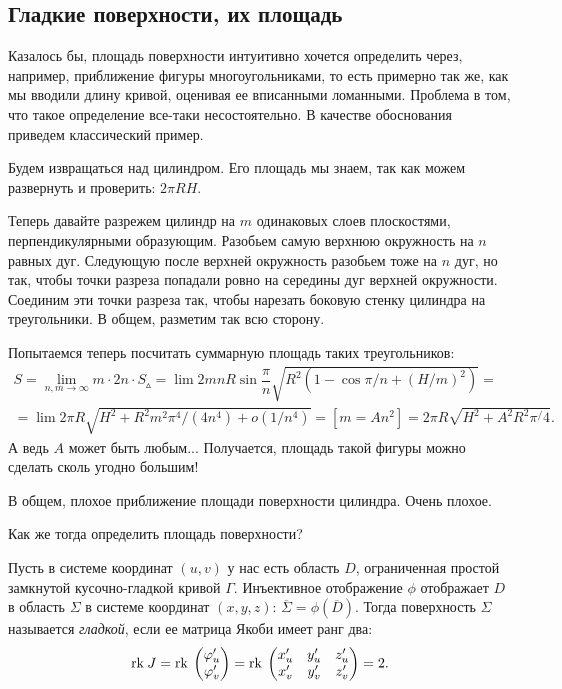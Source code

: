 \subsection{Гладкие поверхности, их площадь}
Казалось бы, площадь поверхности интуитивно хочется определить через, например, приближение фигуры многоугольниками, то есть примерно так же, как мы вводили длину кривой, оценивая ее вписанными ломанными. Проблема в том, что такое определение все-таки несостоятельно. В качестве обоснования приведем классический пример.

\begin{Examples}
Будем извращаться над цилиндром. Его площадь мы знаем, так как можем развернуть и проверить: $2\pi R H$.

Теперь давайте разрежем цилиндр на $m$ одинаковых слоев плоскостями, перпендикулярными образующим. Разобьем самую верхнюю окружность на $n$ равных дуг. Следующую после верхней окружность разобьем тоже на $n$ дуг, но так, чтобы точки
разреза попадали ровно на середины дуг верхней окружности. Соединим эти точки разреза так, чтобы нарезать боковую стенку цилиндра на треугольники. В общем, разметим так всю сторону.

Попытаемся теперь посчитать суммарную площадь таких треугольников:
\begin{gather*}
S = \lim\limits_{n, m \to \infty} m \cdot 2n \cdot S_\vartriangle = \lim 2mn R \sin \dfrac{\pi}{n}\sqrt{R^2(1 - \cos \pi/n + (H/m)^2)} =\\= \lim 2\pi R \sqrt{H^2 + R^2m^2 \pi^4/(4n^4) + o(1/n^4)} = [m = An^2] = 2\pi R\sqrt{H^2 + A^2R^2\pi^/4}.
\end{gather*}
А ведь $A$ может быть любым... Получается, площадь такой фигуры можно сделать сколь угодно большим!

В общем, плохое приближение площади поверхности цилиндра. Очень плохое.
\end{Examples}

Как же тогда определить площадь поверхности?

\begin{Def}
Пусть в системе координат $(u, v)$ у нас есть область $D$, ограниченная простой замкнутой кусочно-гладкой кривой $\Gamma$. Инъективное отображение $\phi$ отображает $D$ в область $\Sigma$ в системе координат $(x, y, z)$: $\overline\Sigma = \phi(\overline D)$. Тогда поверхность $\Sigma$ называется \textit{гладкой}, если ее матрица Якоби имеет ранг два:
$$
\mathrm{rk}\: J = \mathrm{rk}\: \begin{pmatrix}
\varphi'_u \\ \varphi'_v
\end{pmatrix} = \mathrm{rk}\: \begin{pmatrix}
x'_u & y'_u & z'_u \\
x'_v & y'_v & z'_v
\end{pmatrix} = 2.
$$
\end{Def}

